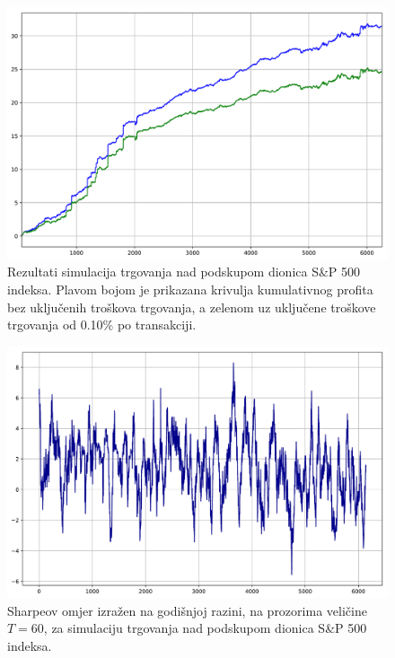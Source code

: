 \documentclass[lmodern, utf8, diplomski, numeric]{fer}
\begin{document}
  \begin{figure}[p]
    \centering
    \includegraphics[width=\linewidth]{graphics/results1.pdf}
    \caption{Rezultati simulacija trgovanja nad podskupom dionica S\&P 500 indeksa. Plavom bojom je prikazana krivulja kumulativnog profita bez uključenih troškova trgovanja, a zelenom uz uključene troškove trgovanja od 0.10\% po transakciji.}
    \label{fig:result1}
  \end{figure}

  \begin{figure}[p]
    \centering
    \includegraphics[width=\linewidth]{graphics/sharpe1.pdf}
    \caption{Sharpeov omjer izražen na godišnjoj razini, na prozorima veličine $T = 60$, za simulaciju trgovanja nad podskupom dionica S\&P 500 indeksa.}
    \label{fig:sharpe1}
  \end{figure}
\end{document}
